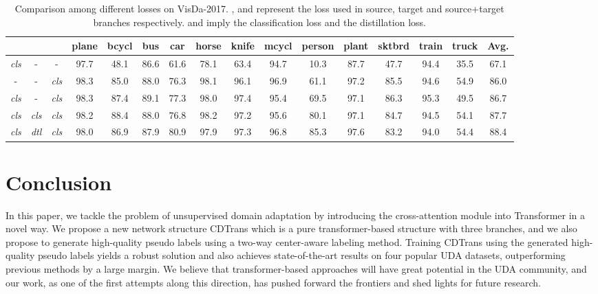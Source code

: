 \documentclass[dvipsnames, svgnames, x11names, table]{article} \usepackage{iclr2022_conference,times}
\begin{document}
\begin{spacing}{1.0}
\begin{table*}[!t]\small
\setlength\tabcolsep{3.4pt}
\begin{tabular}{ccc|cccccccccccc>{\columncolor{lightgray}}c}
\hline
 &  &  & plane & bcycl & bus & car & horse & knife & mcycl & person & plant & sktbrd & train & truck & Avg. \\ 
\hline
\textit{cls} & - & - & 97.7 & 48.1 & 86.6 & 61.6 & 78.1 & 63.4 & 94.7 & 10.3 & 87.7 & 47.7 & 94.4 & 35.5 & 67.1 \\
- & - & \textit{cls} & 98.3 & 85.0 & 88.0 & 76.3 & 98.1 & 96.1 & 96.9 & 61.1 & 97.2 & 85.5 & 94.6 & 54.9 & 86.0 \\
\textit{cls} & - & \textit{cls} & 98.3 & 87.4 & 89.1 & 77.3 & 98.0 & 97.4 & 95.4 & 69.5 & 97.1 & 86.3 & 95.3 & 49.5 & 86.7 \\
\textit{cls} & \textit{cls} & \textit{cls} & 98.2 & 88.4 & 88.0 & 76.8 & 98.2 & 97.2 & 95.6 & 80.1 & 97.1 & 84.7 & 94.5 & 54.1 & 87.7 \\
\textit{cls} & \textit{dtl} & \textit{cls} & 98.0 & 86.9 & 87.9 & 80.9 & 97.9 & 97.3 & 96.8 & 85.3 & 97.6 & 83.2 & 94.0 & 54.4 & 88.4 \\
\hline
\end{tabular}
\vspace{-2mm}
\caption{Comparison among different losses on VisDa-2017. , and  represent the loss used in source, target and source+target branches respectively.  and  imply the classification loss and the distillation loss.}
\vspace{-1mm}
\label{tab:lossexpm}
\end{table*}

\section{Conclusion}
In this paper, we tackle the problem of unsupervised domain adaptation by introducing the cross-attention module into Transformer in a novel way. We propose a new network structure CDTrans which is a pure transformer-based structure with three branches, and we also propose to generate high-quality pseudo labels using a two-way center-aware labeling method. Training CDTrans using the generated high-quality pseudo labels yields a robust solution and also achieves state-of-the-art results on four popular UDA datasets, outperforming previous methods by a large margin. We believe that transformer-based approaches will have great potential in the UDA community, and our work, as one of the first attempts along this direction, has pushed forward the frontiers and shed lights for future research.






\end{spacing}
\end{document}
